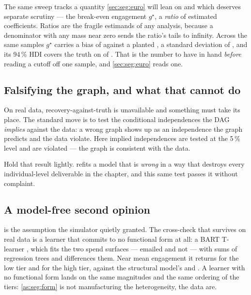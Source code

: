 The same sweep tracks a quantity \cref{sec:seg:euro} will lean on and which deserves separate
scrutiny --- the break-even engagement $g^\star$, a \emph{ratio} of estimated coefficients. Ratios
are the fragile estimands of any analysis, because a denominator with any mass near zero sends the
ratio's tails to infinity. Across the same \nbTwoNSeeds{} samples $g^\star$ carries a bias of
\nbTwoSeedGstarBias{} against a planted \nbTwoTrueGstar, a standard deviation of
\nbTwoSeedGstarSd, and its 94\,\% HDI covers the truth on \nbTwoSeedGstarCov{} of \nbTwoNSeeds.
That is the number to have in hand \emph{before} reading a cutoff off one sample, and
\cref{sec:seg:euro} reads one.

\subsection*{Falsifying the graph, and what that cannot do}

On real data, recovery-against-truth is unavailable and something must take its place. The standard
move is to test the conditional independences the DAG \emph{implies} against the data: a wrong graph
shows up as an independence the graph predicts and the data violate. Here \nbTwoDagTests{} implied
independences are tested at the 5\,\% level and \nbTwoDagViolations{} are violated --- the graph is
consistent with the data.

Hold that result lightly.  refits a model that is \emph{wrong} in a way that
destroys every individual-level deliverable in the chapter, and this same test passes it without
complaint.

\subsection*{A model-free second opinion}

 is the assumption the simulator quietly granted. The cross-check that survives on
real data is a learner that commits to no functional form at all: a BART T-learner
\citep{chipman2010, kunzel2019}, which fits the two spend surfaces --- emailed and not --- with
sums of regression trees and differences them. Near mean engagement it returns \eur{\nbTwoBartLow}
for the low tier and \eur{\nbTwoBartHigh} for the high tier, against the structural model's
\eur{\nbTwoCateLow} and \eur{\nbTwoCateHigh}. A learner with no functional form lands on the same
magnitudes and the same ordering of the tiers: \cref{as:seg:form} is not manufacturing the
heterogeneity, the data are.

